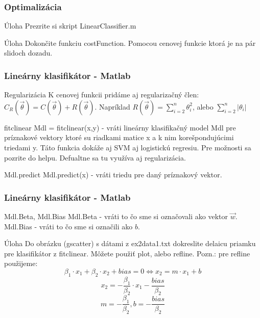 \documentclass{beamer}
\begin{document}
\begin{frame}
\frametitle{Optimalizácia}
\begin{block}{Úloha}
Prezrite si skript LinearClassifier.m
\end{block}

\begin{block}{Úloha}
Dokončite funkciu costFunction. Pomocou cenovej funkcie ktorá je na pár slidoch dozadu.
\end{block}
\end{frame}



\begin{frame}
\frametitle{Lineárny klasifikátor - Matlab}
\begin{block}{Regularizácia}
K cenovej funkcii pridáme aj regularizačný člen: $C_R(\vec{\theta}) = C(\vec{\theta}) + R(\vec{\theta})$. Napríklad $R(\vec{\theta}) = \sum_{i=2}^n \theta_i^2$, alebo $\sum_{i=2}^n |\theta_i |$
\end{block}


\begin{block}{fitclinear}
Mdl = fitclinear(x,y) - vráti lineárny klasifikačný model Mdl pre príznakové vektory ktoré su riadkami matice x a k nim korešpondujúcimi triedami y. Táto funkcia dokáže aj SVM aj logistickú regresiu. Pre možnosti sa pozrite do helpu. Defualtne sa tu využíva aj regularizácia.
\end{block}

\begin{block}{Mdl.predict}
Mdl.predict(x) - vráti triedu pre daný príznakový vektor.
\end{block}
\end{frame}


\begin{frame}
\frametitle{Lineárny klasifikátor - Matlab}
\begin{block}{Mdl.Beta, Mdl.Bias}
Mdl.Beta - vráti to čo sme si označovali ako vektor $\vec{w}$. Mdl.Bias - vráti to čo sme si označili ako $b$.
\end{block}


\begin{block}{Úloha}
Do obrázku (gscatter) s dátami z ex2data1.txt dokreslite delaicu priamku pre klasifikátor z fitclinear. Môžete použiť plot, alebo refline. Pozn.: pre refline použijeme:
$$\beta_1 \cdot x_1 + \beta_2 \cdot x_2 + bias = 0 \iff  x_2 = m \cdot x_1 + b $$
$$x_2 = -\frac{\beta_1}{\beta_2} \cdot x_1 - \frac{bias}{\beta_2}$$
$$ m = -\frac{\beta_1}{\beta_2}, b = - \frac{bias}{\beta_2}$$
\end{block}
\end{frame}
\end{document}
